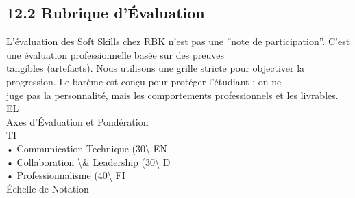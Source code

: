 \documentclass[12pt,landscape,a4paper]{article}
\begin{document}
\subsection{12.2 Rubrique d’Évaluation}
L’évaluation des Soft Skills chez RBK n’est pas une ”note de participation”. C’est une évaluation professionnelle basée sur des preuves\\
tangibles (artefacts). Nous utilisons une grille stricte pour objectiver la progression. Le barème est conçu pour protéger l’étudiant : on ne\\
juge pas la personnalité, mais les comportements professionnels et les livrables.\\
\vspace{0.5em}
\vspace{0.5em}
\vspace{0.5em}
\vspace{0.5em}
EL\\
Axes d’Évaluation et Pondération\\
\vspace{0.5em}
\vspace{0.5em}
\vspace{0.5em}
\vspace{0.5em}
TI\\
• Communication Technique (30\textbackslash{}%
\vspace{0.5em}
\vspace{0.5em}
\vspace{0.5em}
\vspace{0.5em}
EN\\
• Collaboration \textbackslash{}& Leadership (30\textbackslash{}%
\vspace{0.5em}
\vspace{0.5em}
\vspace{0.5em}
\vspace{0.5em}
D\\
• Professionnalisme (40\textbackslash{}%
\vspace{0.5em}
\vspace{0.5em}
\vspace{0.5em}
\vspace{0.5em}
FI\\
Échelle de Notation\\
\end{document}
